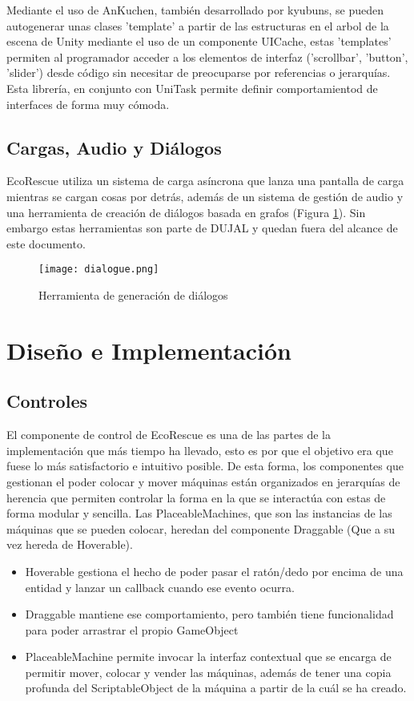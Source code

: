 Mediante el uso de AnKuchen\cite{AnKuchen}, también desarrollado por kyubuns, se pueden autogenerar unas clases 'template' a partir de las estructuras en el arbol de la escena de Unity mediante el uso de un componente UICache, estas 'templates' permiten al programador acceder a los elementos de interfaz ('scrollbar', 'button', 'slider') desde código sin necesitar de preocuparse por referencias o jerarquías. Esta librería, en conjunto con UniTask\cite{UniTask} permite definir comportamientod de interfaces de forma muy cómoda.

\subsection{Cargas, Audio y Diálogos}

EcoRescue utiliza un sistema de carga asíncrona que lanza una pantalla de carga mientras se cargan cosas por detrás, además de un sistema de gestión de audio y una herramienta de creación de diálogos basada en grafos (Figura \ref{fig:dialogue}). Sin embargo estas herramientas son parte de DUJAL\cite{DUJAL} y quedan fuera del alcance de este documento. 

\begin{figure}[H]
    \centering
      \texttt{[image: dialogue.png]}
    \caption{Herramienta de generación de diálogos}
    \label{fig:dialogue}
\end{figure}

\section{Diseño e Implementación} 

\subsection{Controles}

El componente de control de EcoRescue es una de las partes de la implementación que más tiempo ha llevado, esto es por que el objetivo era que fuese lo más satisfactorio e intuitivo posible. De esta forma, los componentes que gestionan el poder colocar y mover máquinas están organizados en jerarquías de herencia que permiten controlar la forma en la que se interactúa con estas de forma modular y sencilla. Las PlaceableMachines, que son las instancias de las máquinas que se pueden colocar, heredan del componente Draggable (Que a su vez hereda de Hoverable). 
\begin{itemize}
    \item Hoverable gestiona el hecho de poder pasar el ratón/dedo por encima de una entidad y lanzar un callback cuando ese evento ocurra. 
    \item Draggable mantiene ese comportamiento, pero también tiene funcionalidad para poder arrastrar el propio GameObject
    \item PlaceableMachine permite invocar la interfaz contextual que se encarga de permitir mover, colocar y vender las máquinas, además de tener una copia profunda del ScriptableObject de la máquina a partir de la cuál se ha creado. 
\end{itemize}


